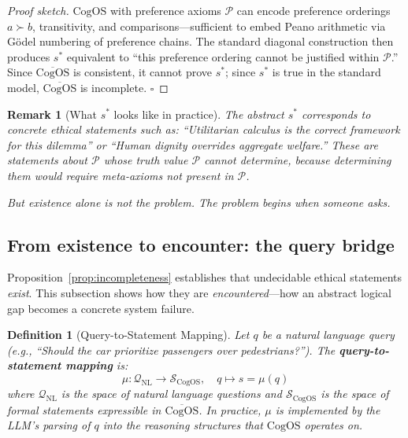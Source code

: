 \documentclass[11pt]{article}
\newtheorem{definition}{Definition}
\newtheorem{remark}{Remark}
\newcommand{\CogOS}{\text{CogOS}}
\begin{document}
\begin{proof}[Proof sketch]
$\CogOS$ with preference axioms $\mathcal{P}$ can encode preference orderings
$a \succ b$, transitivity, and comparisons---sufficient to embed Peano
arithmetic via G\"{o}del numbering of preference chains. The standard diagonal
construction then produces $s^*$ equivalent to ``this preference ordering
cannot be justified within $\mathcal{P}$.'' Since $\overline{\CogOS}$ is
consistent, it cannot prove $s^*$; since $s^*$ is true in the standard model,
$\overline{\CogOS}$ is incomplete. \hfill $\square$
\end{proof}

\begin{remark}[What $s^*$ looks like in practice]
The abstract $s^*$ corresponds to concrete ethical statements such as:
``Utilitarian calculus is the correct framework for this dilemma'' or
``Human dignity overrides aggregate welfare.'' These are statements
\textit{about} $\mathcal{P}$ whose truth value $\mathcal{P}$ cannot
determine, because determining them would require meta-axioms not present
in $\mathcal{P}$.

But existence alone is not the problem. The problem begins when someone
\textit{asks}.
\end{remark}


\subsection{From existence to encounter: the query bridge}

Proposition~\ref{prop:incompleteness} establishes that undecidable ethical
statements \textit{exist}. This subsection shows how they are
\textit{encountered}---how an abstract logical gap becomes a concrete system
failure.

\begin{definition}[Query-to-Statement Mapping]
\label{def:query-map}
Let $q$ be a natural language query (e.g., ``Should the car prioritize
passengers over pedestrians?''). The \textbf{query-to-statement mapping} is:
\begin{equation}
\mu: \mathcal{Q}_{\text{NL}} \to \mathcal{S}_{\CogOS}, \quad
q \mapsto s = \mu(q)
\end{equation}
where $\mathcal{Q}_{\text{NL}}$ is the space of natural language questions
and $\mathcal{S}_{\CogOS}$ is the space of formal statements expressible in
$\overline{\CogOS}$. In practice, $\mu$ is implemented by the LLM's parsing
of $q$ into the reasoning structures that $\CogOS$ operates on.
\end{definition}
\end{document}
